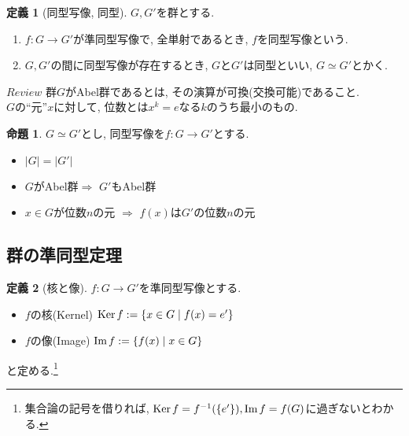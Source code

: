 \documentclass[a4j,dvipdfmx]{jsarticle}
\newcommand{\Ker}{{\rm{Ker}}\hspace{0.5mm}}
\renewcommand{\Im}{{\rm{Im}}\hspace{0.5mm}}
\theoremstyle{definition}
\newtheorem{definition}{定義}
\theoremstyle{definition}
\theoremstyle{definition}
\newtheorem{proposition}{命題}
\begin{document}
            \begin{definition}[同型写像, 同型]
                $G,G'$を群とする.
                \begin{enumerate}
                    \item $f:G\to G'$が準同型写像で, 全単射であるとき, $f$を同型写像という.
                    \item $G,G'$の間に同型写像が存在するとき, $G$と$G'$は同型といい, $G\simeq G'$とかく.
                \end{enumerate}
            \end{definition}
            \clearpage

            \begin{itembox}[l]{$Review$}
                群$G$がAbel群であるとは, その演算が可換(交換可能)であること.\\
                $G$の``元''$x$に対して, 位数とは$x^{k}=e$なる$k$のうち最小のもの.
            \end{itembox}

            \begin{proposition}
                $G\simeq G'$とし, 同型写像を$f:G\to G'$とする.
                \begin{itemize}
                    \item $|G|=|G'|$
                    \item $G$がAbel群$\Rightarrow$ $G'$もAbel群
                    \item $x\in G$が位数$n$の元 $\Rightarrow$ $f(x)$は$G'$の位数$n$の元
                \end{itemize}
            \end{proposition}

        \subsection*{群の準同型定理}
            \begin{definition}[核と像]
                $f:G\to G'$を準同型写像とする.
                \begin{itemize}
                    \item $f$の核(Kernel) $\Ker f:=\{x\in G\mid f(x)=e'\}$
                    \item $f$の像(Image) $\Im f:=\{f(x)\mid x\in G\}$
                \end{itemize}
                と定める.\footnote{集合論の記号を借りれば, $\Ker f=f^{-1}(\{e'\}),\Im f=f(G)$に過ぎないとわかる.}
            \end{definition}
\end{document}
